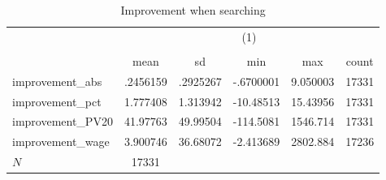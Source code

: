\begin{table}[htbp]\centering
\def\sym#1{\ifmmode^{#1}\else\(^{#1}\)\fi}
\caption{Improvement when searching}
\begin{tabular}{l*{1}{ccccc}}
\hline\hline
            &\multicolumn{5}{c}{(1)}                                         \\
            &\multicolumn{5}{c}{}                                            \\
            &        mean&          sd&         min&         max&       count\\
\hline
improvement\_abs&    .2456159&    .2925267&   -.6700001&    9.050003&       17331\\
improvement\_pct&    1.777408&    1.313942&   -10.48513&    15.43956&       17331\\
improvement\_PV20&    41.97763&    49.99504&   -114.5081&    1546.714&       17331\\
improvement\_wage&    3.900746&    36.68072&   -2.413689&    2802.884&       17236\\
\hline
\(N\)       &       17331&            &            &            &            \\
\hline\hline
\end{tabular}
\end{table}
